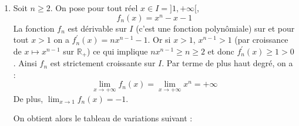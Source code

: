 \documentclass[a4paper,twoside,french,10pt]{VcCours}
\begin{document}
\begin{enumerate}
\item Soit $n \geq 2$. On pose pour tout réel $x \in I = ]1, + \infty[$, 
$$ f_n(x)=x^n-x-1$$
La fonction $f_n$ est dérivable sur $I$ (c'est une fonction polynômiale) sur et pour tout $x > 1$ on a $f_n^{'}(x) = nx^{n-1}-1$. Or si $x > 1$, $x^{n-1} > 1$ (par croissance de $x \mapsto x^{n-1}$ sur $\mathbb{R}_+$) ce qui implique $n x^{n-1} \geq n \geq 2$ et donc $f_n^{'}(x) \geq 1 >0$. Ainsi $f_n$ est strictement croissante sur $I$. Par terme de plus haut degré, on a :
\[ \lim_{x \rightarrow + \infty} f_n(x)  =\lim_{x \rightarrow + \infty} x^n= + \infty \]
De plus, $\lim_{x \rightarrow 1} f_n(x)=-1$.

\vspace{0.2cm}

\noindent On obtient alors le tableau de variations suivant :


\end{enumerate}
\end{document}
